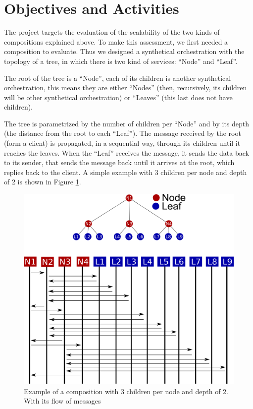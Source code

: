 \section{Objectives and Activities}

The project targets the evaluation of the scalability of the two kinds of compositions explained above. To make this assessment, we first needed a composition to evaluate. Thus we designed a synthetical orchestration with the topology of a tree, in which there is two kind of services: ``Node'' and ``Leaf''.

The root of the tree is a ``Node'', each of its children is another synthetical orchestration, this means they are either ``Nodes'' (then, recursively, its children will be other synthetical orchestration) or ``Leaves'' (this last does not have children).

The tree is parametrized by the number of children per ``Node'' and by its depth (the distance from the root to each ``Leaf''). The message received by the root (form a client) is propagated, in a sequential way, through its children until it reaches the leaves. When the ``Leaf'' receives the message, it sends the data back to its sender, that sends the message back until it arrives at the root, which replies back to the client. A simple example with 3 children per node and depth of 2 is shown in Figure \ref{synthetical-example}.

\begin{figure}[htb]
	\centering
	\includegraphics[width=\textwidth]{images/synthetical-example}
	\caption{Example of a composition with 3 children per node and depth of 2. With its flow of messages}
	\label{synthetical-example}
\end{figure}

